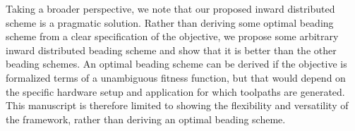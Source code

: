 Taking a broader perspective, we note that our proposed inward distributed scheme is a pragmatic solution.
Rather than deriving some optimal beading scheme from a clear specification of the objective, we propose some arbitrary inward distributed beading scheme and show that it is better than the other beading schemes.
An optimal beading scheme can be derived if the objective is formalized terms of a unambiguous fitness function, but that would depend on the specific hardware setup and application for which toolpaths are generated.
This manuscript is therefore limited to showing the flexibility and versatility of the framework, rather than deriving an optimal beading scheme.




